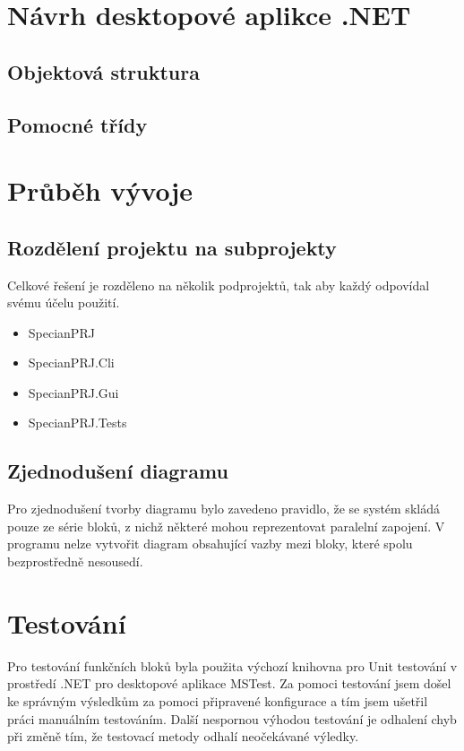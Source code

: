 \documentclass[FM,RP]{tulthesis}
\begin{document}
\chapter{Návrh desktopové aplikce .NET}
    \section{Objektová struktura}

    \section{Pomocné třídy}

\chapter{Průběh vývoje}
    \section{Rozdělení projektu na subprojekty}
        Celkové řešení je rozděleno na několik podprojektů, tak aby každý odpovídal svému účelu použití.
        \begin{itemize} 
        \item SpecianPRJ
        \item SpecianPRJ.Cli
        \item SpecianPRJ.Gui
        \item SpecianPRJ.Tests
        \end{itemize}
    \section{Zjednodušení diagramu}
        Pro zjednodušení tvorby diagramu bylo zavedeno pravidlo, že se systém skládá pouze ze série bloků, z nichž některé mohou reprezentovat paralelní zapojení.
        V programu nelze vytvořit diagram obsahující vazby mezi bloky, které spolu bezprostředně nesousedí.
\chapter{Testování}

    Pro testování funkčních bloků byla použita výchozí knihovna pro Unit testování v prostředí .NET pro desktopové aplikace MSTest.
    Za pomoci testování jsem došel ke správným výsledkům za pomoci připravené konfigurace a tím jsem ušetřil práci manuálním testováním.
    Další nespornou výhodou testování je odhalení chyb při změně tím,  že testovací metody odhalí neočekávané výledky.
\end{document}
